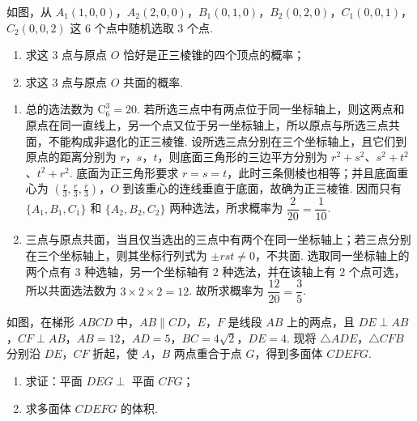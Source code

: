 \begin{problem}
如图，从 \(A_{1}(1,0,0)\)，\(A_{2}(2,0,0)\)，\(B_{1}(0,1,0)\)，\(B_{2}(0,2,0)\)，\(C_{1}(0,0,1)\)，\(C_{2}(0,0,2)\) 这 6 个点中随机选取 3 个点.
\begin{enumerate}
\item 求这 3 点与原点 \(O\) 恰好是正三棱锥的四个顶点的概率；
\item 求这 3 点与原点 \(O\) 共面的概率.
\end{enumerate}

\end{problem}

\begin{solution}
\begin{enumerate}
\item 总的选法数为 \(\mathrm C_6^3=20\). 若所选三点中有两点位于同一坐标轴上，则这两点和原点在同一直线上，另一个点又位于另一坐标轴上，所以原点与所选三点共面，不能构成非退化的正三棱锥. 设所选三点分别在三个坐标轴上，且它们到原点的距离分别为 \(r\)，\(s\)，\(t\)，则底面三角形的三边平方分别为 \(r^2+s^2\)、\(s^2+t^2\)、\(t^2+r^2\). 底面为正三角形要求 \(r=s=t\)，此时三条侧棱也相等；并且底面重心为 \((\frac{r}{3},\frac{r}{3},\frac{r}{3})\)，\(O\) 到该重心的连线垂直于底面，故确为正三棱锥. 因而只有
\(\{A_1,B_1,C_1\}\) 和 \(\{A_2,B_2,C_2\}\) 两种选法，所求概率为
\(\dfrac{2}{20}=\dfrac{1}{10}\).

\item 三点与原点共面，当且仅当选出的三点中有两个在同一坐标轴上；若三点分别在三个坐标轴上，则其坐标行列式为 \(\pm rst\neq0\)，不共面. 选取同一坐标轴上的两个点有 \(3\) 种选轴，另一个坐标轴有 \(2\) 种选法，并在该轴上有 \(2\) 个点可选，所以共面选法数为
\(3\times2\times2=12\). 故所求概率为 \(\dfrac{12}{20}=\dfrac35\).
\end{enumerate}
\end{solution}

\begin{problem}
如图，在梯形 \(ABCD\) 中，\(AB \parallel CD\)，\(E\)，\(F\) 是线段 \(AB\) 上的两点，且 \(DE \perp AB\)，\(CF \perp AB\)，\(AB = 12\)，\(AD = 5\)，\(BC = 4\sqrt{2}\)，\(DE = 4\). 现将 \(\triangle ADE\)，\(\triangle CFB\) 分别沿 \(DE\)，\(CF\) 折起，使 \(A\)，\(B\) 两点重合于点 \(G\)，得到多面体 \(CDEFG\).
\begin{enumerate}
\item 求证：平面 \(DEG \perp\) 平面 \(CFG\)；
\item 求多面体 \(CDEFG\) 的体积.
\end{enumerate}

\end{problem}

